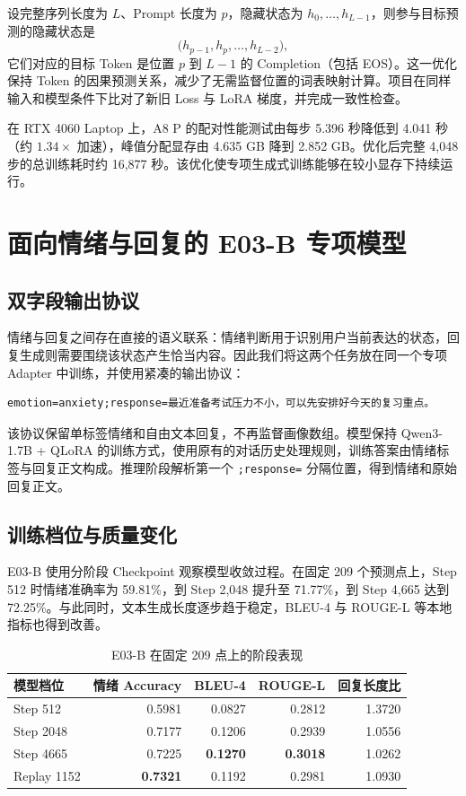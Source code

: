 \documentclass[UTF8,a4paper,zihao=-4,oneside]{ctexrep}
\begin{document}
设完整序列长度为 $L$、Prompt 长度为 $p$，隐藏状态为 $h_0,\dots,h_{L-1}$，则参与目标预测的隐藏状态是
\begin{equation}
 \bigl(h_{p-1},h_p,\ldots,h_{L-2}\bigr),
\end{equation}
它们对应的目标 Token 是位置 $p$ 到 $L-1$ 的 Completion（包括 EOS）。这一优化保持 Token 的因果预测关系，减少了无需监督位置的词表映射计算。项目在同样输入和模型条件下比对了新旧 Loss 与 LoRA 梯度，并完成一致性检查。

在 RTX 4060 Laptop 上，A8 P 的配对性能测试由每步 5.396 秒降低到 4.041 秒（约 $1.34\times$ 加速），峰值分配显存由 4.635 GB 降到 2.852 GB。优化后完整 4,048 步的总训练耗时约 16,877 秒。该优化使专项生成式训练能够在较小显存下持续运行。

\section{面向情绪与回复的 E03-B 专项模型}
\subsection{双字段输出协议}
情绪与回复之间存在直接的语义联系：情绪判断用于识别用户当前表达的状态，回复生成则需要围绕该状态产生恰当内容。因此我们将这两个任务放在同一个专项 Adapter 中训练，并使用紧凑的输出协议：
\begin{Verbatim}[fontsize=\small,frame=single]
emotion=anxiety;response=最近准备考试压力不小，可以先安排好今天的复习重点。
\end{Verbatim}
该协议保留单标签情绪和自由文本回复，不再监督画像数组。模型保持 Qwen3-1.7B + QLoRA 的训练方式，使用原有的对话历史处理规则，训练答案由情绪标签与回复正文构成。推理阶段解析第一个 \texttt{;response=} 分隔位置，得到情绪和原始回复正文。

\subsection{训练档位与质量变化}
E03-B 使用分阶段 Checkpoint 观察模型收敛过程。在固定 209 个预测点上，Step 512 时情绪准确率为 59.81\%，到 Step 2,048 提升至 71.77\%，到 Step 4,665 达到 72.25\%。与此同时，文本生成长度逐步趋于稳定，BLEU-4 与 ROUGE-L 等本地指标也得到改善。

\begin{table}[htbp]\centering\caption{E03-B 在固定 209 点上的阶段表现}\label{tab:e03b-training}
\begin{tabular}{lrrrr}
\toprule
模型档位 & 情绪 Accuracy & BLEU-4 & ROUGE-L & 回复长度比\\\midrule
Step 512 & 0.5981 & 0.0827 & 0.2812 & 1.3720\\
Step 2048 & 0.7177 & 0.1206 & 0.2939 & 1.0556\\
Step 4665 & 0.7225 & \textbf{0.1270} & \textbf{0.3018} & 1.0262\\
Replay 1152 & \textbf{0.7321} & 0.1192 & 0.2981 & 1.0930\\
\bottomrule
\end{tabular}
\end{table}
\end{document}
